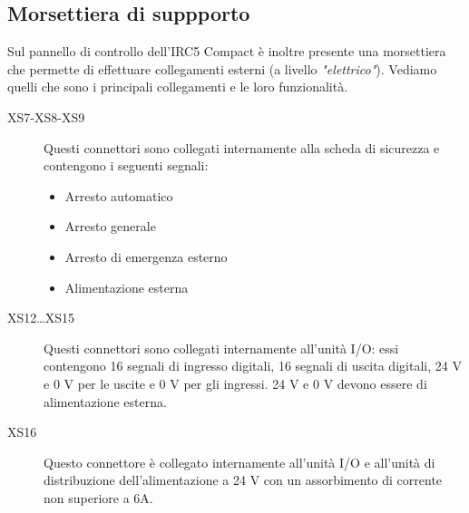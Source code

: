 \subsection{Morsettiera di suppporto}
Sul pannello di controllo dell'IRC5 Compact è inoltre presente una morsettiera che permette di effettuare collegamenti esterni (a livello \emph{"elettrico"}). Vediamo quelli che sono i principali collegamenti e le loro funzionalità.
\begin{description}
	\item[XS7-XS8-XS9] Questi connettori sono collegati internamente alla scheda di sicurezza e contengono i seguenti segnali:
	\begin{itemize}
		\item Arresto automatico
		\item Arresto generale
		\item Arresto di emergenza esterno
		\item Alimentazione esterna
	\end{itemize}
	\item[XS12\dots XS15] Questi connettori sono collegati internamente all'unità I/O: essi contengono 16 segnali di ingresso digitali, 16 segnali di uscita digitali,
	24 V e 0 V per le uscite e 0 V per gli ingressi. 24 V e 0 V devono essere di	alimentazione esterna.
	\item[XS16] Questo connettore è collegato internamente all'unità I/O e all'unità di
	distribuzione dell'alimentazione a 24 V con un assorbimento di corrente non superiore a 6A.
\end{description}
